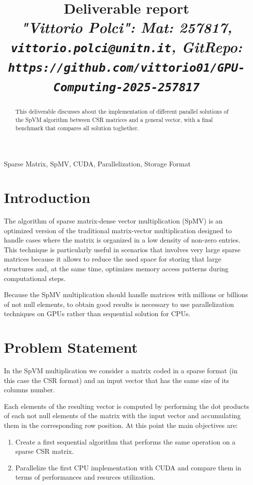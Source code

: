 \documentclass[conference]{IEEEtran}
\begin{document}
\title{Deliverable report \\
\footnotesize \textit{"Vittorio Polci": Mat: 257817, \texttt{vittorio.polci@unitn.it}, GitRepo: \texttt{https://github.com/vittorio01/GPU-Computing-2025-257817}}}

\maketitle

\begin{abstract}
This deliverable discusses about the implementation of different parallel solutions of the SpVM algorithm between CSR matrices and a general vector,
with a final benchmark that compares all solution toghether. 

\end{abstract}

\begin{IEEEkeywords}
Sparse Matrix, SpMV, CUDA, Parallelization, Storage Format
\end{IEEEkeywords}

\section{Introduction}
The algorithm of sparse matrix-dense vector multiplication (SpMV) is an optimized version of the traditional matrix-vector multiplication
designed to handle cases where the matrix is organized in a low density of non-zero entries. 
This technique is particularly useful in scenarios that involves very large sparse matrices because it allows to reduce the used space for 
storing that large structures and, at the same time, optimizes memory access patterns during computational steps. 

Because the SpMV multiplication should handle matrices with millions or billions of not null elements, to obtain good results is necessary to use parallelization techniques 
on GPUs rather than sequential solution for CPUs. 

\section{Problem Statement}
In the SpVM multiplication we consider a matrix coded in a sparse format (in this case the CSR format) and an input vector that has the same size of its columns number. 

Each elements of the resulting vector is computed by performing the dot products of each not null elements of the matrix with the input vector and accumulating them in the corresponding row position.
At this point the main objectives are:
\begin{enumerate}
    \item Create a first sequential algorithm that performs the same operation on a sparse CSR matrix.
    \item Parallelize the first CPU implementation with CUDA and compare them in terms of performances and resurces utilization. 
\end{enumerate}
\end{document}
